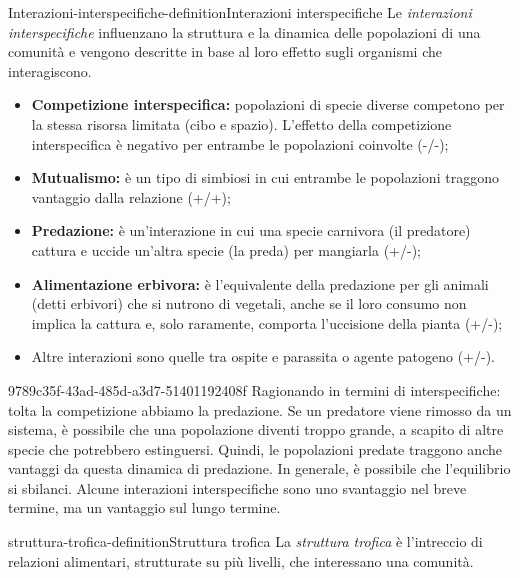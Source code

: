 \documentclass[preview]{standalone}
\begin{document}
\begin{snippetdefinition}{Interazioni-interspecifiche-definition}{Interazioni interspecifiche}
    Le \textit{interazioni interspecifiche} influenzano la struttura e la
    dinamica delle popolazioni di una comunità e vengono
    descritte in base al loro effetto sugli organismi che
    interagiscono.
    \begin{itemize}
        \item \textbf{Competizione interspecifica:} popolazioni di specie diverse
            competono per la stessa risorsa limitata (cibo e spazio).
            L'effetto della competizione interspecifica è negativo per
            entrambe le popolazioni coinvolte (-/-);
        \item \textbf{Mutualismo:} è un tipo di simbiosi in cui entrambe le
            popolazioni traggono vantaggio dalla relazione (+/+);
        \item \textbf{Predazione:} è un'interazione in cui una specie carnivora
            (il predatore) cattura e uccide un'altra specie (la preda)
            per mangiarla (+/-);
        \item \textbf{Alimentazione erbivora:} è l'equivalente della predazione
            per gli animali (detti erbivori) che si nutrono di vegetali,
            anche se il loro consumo non implica la cattura e, solo
            raramente, comporta l'uccisione della pianta (+/-);
        \item Altre interazioni sono quelle tra ospite e parassita o agente patogeno (+/-).
    \end{itemize}
\end{snippetdefinition}

\begin{snippet}{9789c35f-43ad-485d-a3d7-51401192408f}
    Ragionando in termini di interspecifiche: tolta la competizione abbiamo la predazione.
    Se un predatore viene rimosso da un sistema, è possibile che una popolazione diventi
    troppo grande, a scapito di altre specie che potrebbero estinguersi.
    Quindi, le popolazioni predate traggono anche vantaggi da questa dinamica di predazione.
    In generale, è possibile che l'equilibrio si sbilanci.
    Alcune interazioni interspecifiche sono uno svantaggio nel breve termine, ma un vantaggio sul lungo termine.
\end{snippet}

\begin{snippetdefinition}{struttura-trofica-definition}{Struttura trofica}
    La \textit{struttura trofica} è l'intreccio di relazioni alimentari,
    strutturate su più livelli, che interessano una comunità.
\end{snippetdefinition}
\end{document}
